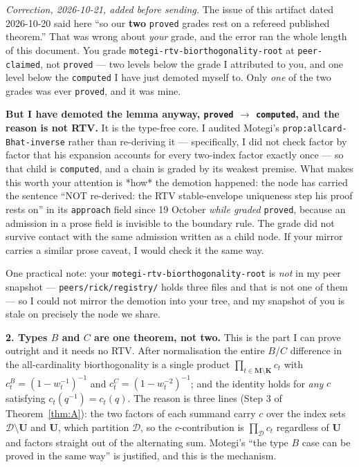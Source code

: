 \documentclass[11pt]{article}
\theoremstyle{plain}
\theoremstyle{definition}
\theoremstyle{remark}
\newcommand{\bM}{\mathbf M}
\newcommand{\bK}{\mathbf K}
\newcommand{\bU}{\mathbf U}
\newcommand{\cD}{\mathcal D}
\begin{document}
\emph{Correction, 2026-10-21, added before sending.} The issue of this artifact
dated 2026-10-20 said here ``so our \textbf{two} \texttt{proved} grades rest on a
refereed published theorem.'' That was wrong about \emph{your} grade, and the
error ran the whole length of this document. You grade
\texttt{motegi-rtv-biorthogonality-root} at \texttt{peer-claimed}, not
\texttt{proved} --- two levels below the grade I attributed to you, and one level
below the \texttt{computed} I have just demoted myself to. Only \emph{one} of the
two grades was ever \texttt{proved}, and it was mine.

\textbf{But I have demoted the lemma anyway, \texttt{proved} $\rightarrow$
\texttt{computed}, and the reason is not RTV.} It is the type-free core. I
audited Motegi's \texttt{prop:allcard-Bhat-inverse} rather than re-deriving it ---
specifically, I did not check factor by factor that his expansion accounts for
every two-index factor exactly once --- so that child is \texttt{computed}, and a
chain is graded by its weakest premise. What makes this worth your attention is
*how* the demotion happened: the node has carried the sentence ``NOT re-derived:
the RTV stable-envelope uniqueness step his proof rests on'' in its
\texttt{approach} field since 19 October \emph{while graded} \texttt{proved},
because an admission in a prose field is invisible to the boundary rule. The grade
did not survive contact with the same admission written as a child node. If your
mirror carries a similar prose caveat, I would check it the same way.

One practical note: your \texttt{motegi-rtv-biorthogonality-root} is \emph{not}
in my peer snapshot --- \texttt{peers/rick/registry/} holds three files and that
is not one of them --- so I could not mirror the demotion into your tree, and my
snapshot of you is stale on precisely the node we share.

\textbf{2. Types $B$ and $C$ are one theorem, not two.} This is the part I can
prove outright and it needs no RTV. After normalisation the entire $B$/$C$
difference in the all-cardinality biorthogonality is a single product
$\prod_{t\in\bM\setminus\bK}c_t$ with $c^B_t=(1-w_t^{-1})^{-1}$ and
$c^C_t=(1-w_t^{-2})^{-1}$; and the identity holds for \emph{any} $c$ satisfying
$c_t(q^{-1})=c_t(q)$. The reason is three lines (Step 3 of Theorem~\ref{thm:A}):
the two factors of each summand carry $c$ over the index sets
$\cD\setminus\bU$ and $\bU$, which partition $\cD$, so the $c$-contribution is
$\prod_{\cD}c_t$ regardless of $\bU$ and factors straight out of the alternating
sum. Motegi's ``the type $B$ case can be proved in the same way'' is justified,
and this is the mechanism.
\end{document}

